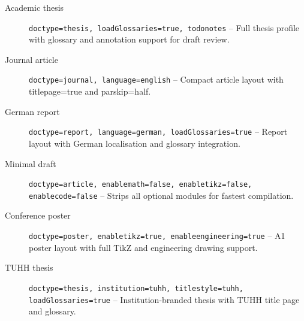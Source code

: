 \begin{description}
    \item[Academic thesis] \texttt{doctype=thesis, loadGlossaries=true,
        todonotes} -- Full thesis profile with glossary and annotation
        support for draft review.

    \item[Journal article] \texttt{doctype=journal,
        language=english} -- Compact article layout with
        \textsf{titlepage=true} and \textsf{parskip=half}.

    \item[German report] \texttt{doctype=report,
        language=german, loadGlossaries=true} -- Report layout with German
        localisation and glossary integration.

    \item[Minimal draft] \texttt{doctype=article,
        enablemath=false, enabletikz=false, enablecode=false} -- Strips
        all optional modules for fastest compilation.

    \item[Conference poster] \texttt{doctype=poster,
        enabletikz=true, enableengineering=true} -- A1 poster layout
        with full TikZ and engineering drawing support.

    \item[TUHH thesis] \texttt{doctype=thesis,
        institution=tuhh, titlestyle=tuhh, loadGlossaries=true} --
        Institution-branded thesis with TUHH title page and glossary.
\end{description}
